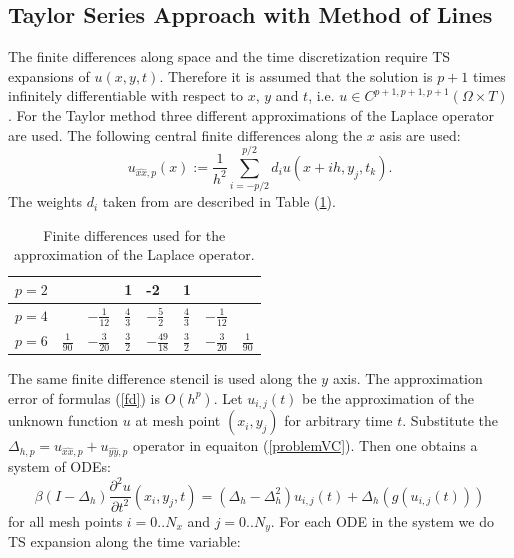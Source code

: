 \documentclass[%
 aip,
cp,  %
 amsmath,amssymb,%
 reprint,%
]{revtex4-2}
\newcommand{\be}{\begin{equation}}
\newcommand{\ee}{\end{equation}}
\newcommand{\rf}[1]{(\ref{#1})}
\begin{document}
\subsection{ Taylor Series Approach with Method of Lines }
The finite differences along space and the time discretization require TS expansions of $u(x,y,t)$. Therefore it is assumed that the solution is $p+1$ times infinitely differentiable with respect to $x$, $y$ and $t$, i.e. $u \in C^{p+1,p+1,p+1}(\Omega \times T)$.
For the Taylor method three different approximations of the Laplace operator are used. The following central finite differences along the $x$ asis are used:
\begin{equation}\label{fd}
u_{\widehat{xx},p}(x) :=  \frac{1}{h^2} \sum\limits_{i=-p/2}^{p/2} d_i u(x+ih, y_j, t_k).
\end{equation}
The weights $d_i$ taken from  \cite{forn} are described in Table \rf{table:A00}. 
\begin{table}[ht]
\centering
\small
		\begin{tabular}{||c|l|l|l|l|l|l|l||}
			\hline
			\hline
            $p=2$          &          &                                 &     1      &   -2   &    1    &    &        \\
   			\hline 
			\hline 
           $p=4$          &                            &   $-\frac{1}{12}$     &     $\frac{4}{3}$      &   $-\frac{5}{2} $     &    $\frac{4}{3}$    &  $-\frac{1}{12}$   &        \\
	   \hline
			\hline 
            $p=6$        &   $\frac{1}{90}$       &     $-\frac{3}{20}$     &    $\frac{3}{2}$      &    $-\frac{49}{18}$   &    $\frac{3}{2}$    & $-\frac{3}{20}$    &    $\frac{1}{90}$       \\
	   \hline
			\hline 
		\end{tabular}
	\caption{ Finite differences used for the approximation of the Laplace operator.}
	\label{table:A00}
\end{table}
The same finite difference stencil is used along the $y$ axis. The approximation error of  formulas \rf{fd} is $O(h^p)$. Let $u_{i,j}(t)$ be the approximation of the unknown function $u$ at mesh point $(x_i, y_j)$ for arbitrary time $t$. Substitute the $\Delta_{h,p} = u_{\widehat{xx},p} + u_{\widehat{yy},p}$ operator in equaiton \rf{problemVC}. Then one obtains a system of ODEs:
\be \label{DiscreteEq}
\beta (I-\Delta_h) \frac{\partial^2 u}{\partial t^2}(x_i, y_j, t)=
 (\Delta_h - \Delta_h^2) u_{i, j}(t) + \Delta_h ( g( u_{i, j}(t) ) )
\ee
for all mesh points $i = 0..N_x$ and $j=0..N_y$. For each ODE in the system we do TS expansion along the time variable:
\end{document}
